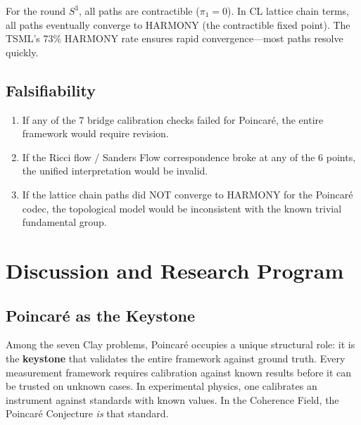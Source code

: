 \documentclass[11pt]{article}
\begin{document}
For the round $S^3$, all paths are contractible ($\pi_1 = 0$). In CL lattice chain terms, all paths eventually converge to HARMONY (the contractible fixed point). The TSML's 73\% HARMONY rate ensures rapid convergence---most paths resolve quickly.

\subsection{Falsifiability}
\label{subsec:calibration-falsifiability}

\begin{enumerate}
\item If any of the 7 bridge calibration checks failed for Poincar\'e, the entire framework would require revision.
\item If the Ricci flow / Sanders Flow correspondence broke at any of the 6 points, the unified interpretation would be invalid.
\item If the lattice chain paths did NOT converge to HARMONY for the Poincar\'e codec, the topological model would be inconsistent with the known trivial fundamental group.
\end{enumerate}

\section{Discussion and Research Program}
\label{sec:discussion}

\subsection{Poincar\'e as the Keystone}
\label{subsec:keystone}

Among the seven Clay problems, Poincar\'e occupies a unique structural
role: it is the \textbf{keystone} that validates the entire framework
against ground truth.  Every measurement framework requires calibration
against known results before it can be trusted on unknown cases.  In
experimental physics, one calibrates an instrument against standards
with known values.  In the Coherence Field, the Poincar\'e Conjecture
\emph{is} that standard.
\end{document}
